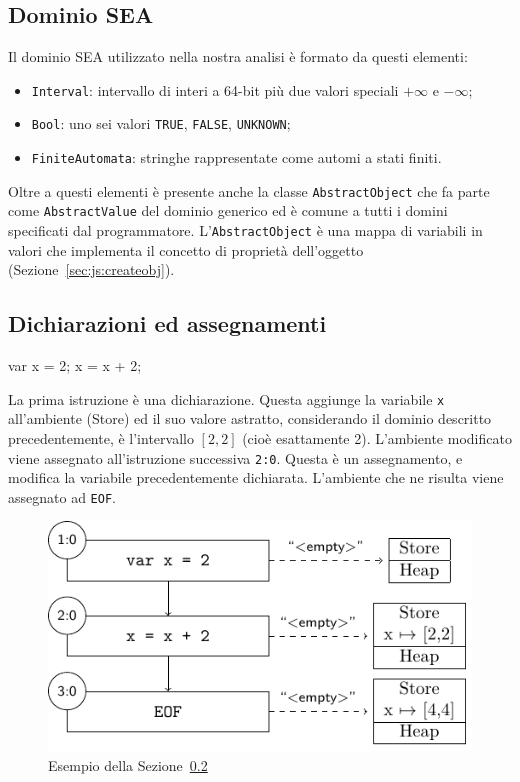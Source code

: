 \subsection{Dominio SEA}

Il dominio SEA utilizzato nella nostra analisi è formato da questi elementi:
\begin{itemize}
    \item \texttt{Interval}: intervallo di interi a 64-bit più due valori speciali $+\infty$ e $-\infty$;
    \item \texttt{Bool}: uno sei valori \texttt{TRUE}, \texttt{FALSE}, \texttt{UNKNOWN};
    \item \texttt{FiniteAutomata}: stringhe rappresentate come automi a stati finiti.
\end{itemize}
Oltre a questi elementi è presente anche la classe \texttt{AbstractObject} che fa parte come \texttt{AbstractValue} del dominio generico ed è comune a tutti i domini specificati dal programmatore. L'\texttt{AbstractObject} è una mappa di variabili in valori che implementa il concetto di proprietà dell'oggetto (Sezione~\ref{sec:js:createobj}). 

\subsection{Dichiarazioni ed assegnamenti}\label{sec:realizzazione:dichiarazioni}
\begin{javascriptcode}
var x = 2;
x = x + 2;
\end{javascriptcode}
La prima istruzione è una dichiarazione. Questa aggiunge la variabile \texttt{x} all'ambiente (Store) ed il suo valore astratto, considerando il dominio descritto precedentemente, è l'intervallo $[2,2]$ (cioè esattamente 2). L'ambiente modificato viene assegnato all'istruzione successiva \texttt{2:0}. Questa è un assegnamento, e modifica la variabile precedentemente dichiarata. L'ambiente che ne risulta viene assegnato ad \texttt{EOF}. 

\begin{figure}[htbp]
    \centering
    \includegraphics{scheme-generator/generated/example-declaration.pdf}
    \caption{Esempio della Sezione~\ref{sec:realizzazione:dichiarazioni}}
    \label{fig:realizzazione:dichiarazioni}
\end{figure}

